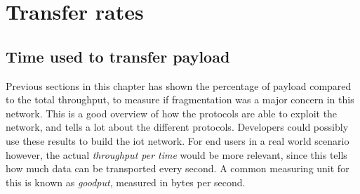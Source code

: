 

\section{Transfer rates}

\subsection{Time used to transfer payload}

\noindent Previous sections in this chapter has shown the percentage of payload compared to the total throughput, to measure if fragmentation was a major concern in this network. This is a good overview of how the protocols are able to exploit the network, and tells a lot about the different protocols. Developers could possibly use these results to build the \gls{iot} network. For end users in a real world scenario however, the actual \textit{throughput per time} would be more relevant, since this tells how much data can be transported every second. A common measuring unit for this is known as \textit{\gls{goodput}}, measured in bytes per second.  




